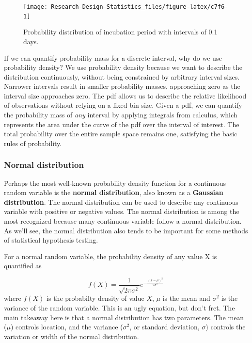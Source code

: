 \documentclass[
]{book}
\begin{document}
\begin{figure}

{\centering \texttt{[image: Research-Design---Statistics\_files/figure-latex/c7f6-1]} 

}

\caption{Probability distribution of incubation period with intervals of 0.1 days.}\label{fig:c7f6}
\end{figure}

If we can quantify probability mass for a discrete interval, why do we use probability density? We use probability density because we want to describe the distribution continuously, without being constrained by arbitrary interval sizes. Narrower intervals result in smaller probability masses, approaching zero as the interval size approaches zero. The pdf allows us to describe the relative likelihood of observations without relying on a fixed bin size. Given a pdf, we can quantify the probability mass of \emph{any} interval by applying integrals from calculus, which represents the area under the curve of the pdf over the interval of interest. The total probability over the entire sample space remains one, satisfying the basic rules of probability.

\subsubsection{Normal distribution}\label{normal-distribution}

Perhaps the most well-known probability density function for a continuous random variable is the \textbf{normal distribution}, also known as a \textbf{Gaussian distribution}. The normal distribution can be used to describe any continuous variable with positive or negative values. The normal distribution is among the most recognized because many continuous variable follow a normal distribution. As we'll see, the normal distribution also tends to be important for some methods of statistical hypothesis testing.

For a normal random variable, the probability density of any value X is quantified as

\[
f(X) = \frac{1}{\sqrt{2\pi\sigma^2}} e^{-\frac{(x - \mu)^2}{2\sigma^2}}
\]
where \(f(X)\) is the probabilty density of value \(X\), \(\mu\) is the mean and \(\sigma^2\) is the variance of the random variable. This is an ugly equation, but don't fret. The main takeaway here is that a normal distribution has two parameters. The mean (\(\mu\)) controls location, and the variance (\(\sigma^2\), or standard deviation, \(\sigma\)) controls the variation or width of the normal distribution.
\end{document}
